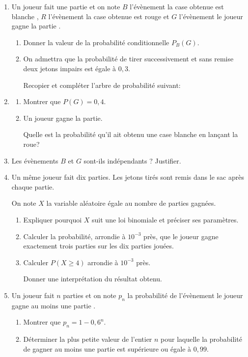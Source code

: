 \documentclass[12pt]{book}
\begin{document}
\begin{enumerate}
\item Un joueur fait une partie et on note $B$ l'évènement \og la case obtenue est blanche \fg,
$R$ l'évènement \og la case obtenue est rouge\fg{} et $G$ l'évènement \og le joueur gagne la partie \fg. 
	\begin{enumerate}
		\item Donner la valeur de la probabilité conditionnelle $P_B(G)$.
		\item On admettra que la probabilité de tirer successivement et sans remise deux jetons impairs est égale à $0,3$. 
		
Recopier et compléter l'arbre de probabilité suivant:


	\end{enumerate}

\item
	\begin{enumerate}
		\item Montrer que $P(G) = 0,4$.
		\item Un joueur gagne la partie.
		
Quelle est la probabilité qu'il ait obtenu une case blanche en lançant la roue?
	\end{enumerate}
\item Les évènements $B$ et $G$ sont-ils indépendants ? Justifier.
\item Un même joueur fait dix parties. Les jetons tirés sont remis dans le sac après chaque partie.

On note $X$ la variable aléatoire égale au nombre de parties gagnées.
	\begin{enumerate}
		\item Expliquer pourquoi $X$ suit une loi binomiale et préciser ses paramètres.
		\item Calculer la probabilité, arrondie à $10^{-3}$ près, que le joueur gagne exactement trois parties sur les dix parties jouées.
		\item Calculer $P (X \geqslant 4)$ arrondie à $10^{-3}$ près.
		
Donner une interprétation du résultat obtenu.
	\end{enumerate}
\item Un joueur fait $n$ parties et on note $p_n$ la probabilité de l'évènement \og le joueur gagne au moins une partie \fg.
	\begin{enumerate}
		\item Montrer que $p_n = 1 - 0,6^n$.
		\item Déterminer la plus petite valeur de l'entier $n$ pour laquelle la probabilité de gagner au moins une partie est supérieure ou égale à $0,99$.
	\end{enumerate}
\end{enumerate}

\bigskip
\end{document}
